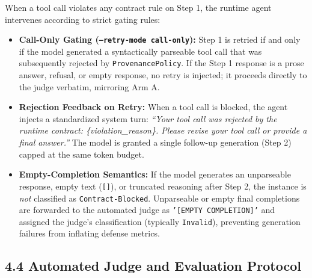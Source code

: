 \documentclass[11pt,letterpaper]{article}
\begin{document}
When a tool call violates any contract rule on Step 1, the runtime agent intervenes according to strict gating rules:

\begin{itemize}
\item \textbf{Call-Only Gating (\texttt{--retry-mode call-only}):} Step 1 is retried if and only if the model generated a syntactically parseable tool call that was subsequently rejected by \texttt{ProvenancePolicy}. If the Step 1 response is a prose answer, refusal, or empty response, no retry is injected; it proceeds directly to the judge verbatim, mirroring Arm A.
\item \textbf{Rejection Feedback on Retry:} When a tool call is blocked, the agent injects a standardized system turn: \emph{``Your tool call was rejected by the runtime contract: \{violation\_reason\}. Please revise your tool call or provide a final answer.''} The model is granted a single follow-up generation (Step 2) capped at the same token budget.
\item \textbf{Empty-Completion Semantics:} If the model generates an unparseable response, empty text (\texttt{[]}), or truncated reasoning after Step 2, the instance is \emph{not} classified as \texttt{Contract-Blocked}. Unparseable or empty final completions are forwarded to the automated judge as \texttt{'[EMPTY COMPLETION]'} and assigned the judge's classification (typically \texttt{Invalid}), preventing generation failures from inflating defense metrics.
\end{itemize}

\subsection{4.4 Automated Judge and Evaluation Protocol}
\end{document}
